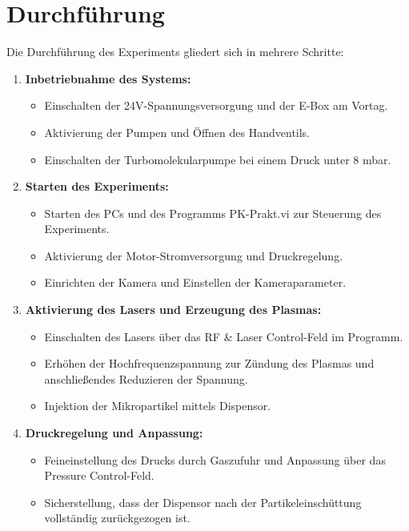 \documentclass[12pt,a4paper,ngerman]{report}
\begin{document}
\newpage
\section{Durchführung}
Die Durchführung des Experiments gliedert sich in mehrere Schritte:

\begin{enumerate}
    \item \textbf{Inbetriebnahme des Systems:}
    \begin{itemize}
        \item Einschalten der 24V-Spannungsversorgung und der E-Box am Vortag.
        \item Aktivierung der Pumpen und Öffnen des Handventils.
        \item Einschalten der Turbomolekularpumpe bei einem Druck unter 8 mbar.
    \end{itemize}
    \item \textbf{Starten des Experiments:}
    \begin{itemize}
        \item Starten des PCs und des Programms \glqq{}PK-Prakt.vi\grqq{} zur Steuerung des Experiments.
        \item Aktivierung der Motor-Stromversorgung und Druckregelung.
        \item Einrichten der Kamera und Einstellen der Kameraparameter.
    \end{itemize}
    \item \textbf{Aktivierung des Lasers und Erzeugung des Plasmas:}
    \begin{itemize}
        \item Einschalten des Lasers über das \glqq{}RF \& Laser Control\grqq{}-Feld im Programm.
        \item Erhöhen der Hochfrequenzspannung zur Zündung des Plasmas und anschließendes Reduzieren der Spannung.
        \item Injektion der Mikropartikel mittels Dispensor.
    \end{itemize}
    \item \textbf{Druckregelung und Anpassung:}
    \begin{itemize}
        \item Feineinstellung des Drucks durch Gaszufuhr und Anpassung über das \glqq{}Pressure Control\grqq{}-Feld.
        \item Sicherstellung, dass der Dispensor nach der Partikeleinschüttung vollständig zurückgezogen ist.
    \end{itemize}
\end{enumerate}
\end{document}

